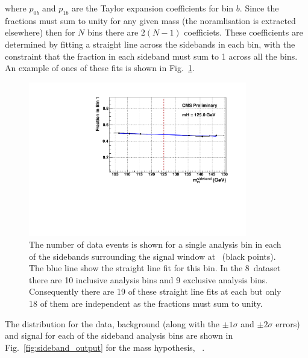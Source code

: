 where $p_{0b}$ and $p_{1b}$ are the Taylor expansion coefficients for bin $b$. Since the fractions must sum to unity for any given mass (the noramlisation is extracted elsewhere) then for $N$ bins there are $2(N-1)$ coefficiets. These coefficients are determined by fitting a straight line across the sidebands in each bin, with the constraint that the fraction in each sideband must sum to 1 across all the bins. An example of ones of these fits is shown in Fig.~\ref{fig:sideband_shape}.

\begin{figure}
  \begin{center}
    \includegraphics[width=0.85\textwidth]{ch5_anal_and_results/plots/sideband/sideband_fit.pdf}
    \caption{The number of data events is shown for a single analysis bin in each of the sidebands surrounding the signal window at ~\GeV (black points). The blue line show the straight line fit for this bin. In the 8~\TeV dataset there are 10 inclusive analysis bins and 9 exclusive analysis bins. Consequently there are 19 of these straight line fits at each \mH but only 18 of them are independent as the fractions must sum to unity.}
    \label{fig:sideband_shape}
  \end{center}
\end{figure}

The distribution for the data, background (along with the $\pm1\sigma$ and $\pm2\sigma$ errors) and signal for each of the sideband analysis bins are shown in Fig.~\ref{fig:sideband_output} for the mass hypothesis, ~\GeV.

